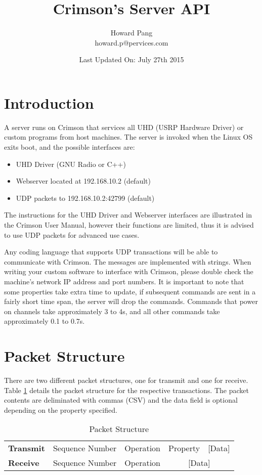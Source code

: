 \documentclass[11pt]{article}
\title{\textbf{Crimson's Server API}}
\author{Howard Pang\\
	howard.p@pervices.com}
\date{Last Updated On: July 27th 2015}
\begin{document}
\maketitle

\section{Introduction}
\label{sec:introduction}
A server runs on Crimson that services all UHD (USRP Hardware Driver) or custom programs from host machines. The server is invoked when the Linux OS exits boot, and the possible interfaces are:
\begin{itemize}
	\item UHD Driver (GNU Radio or C++)
	\item Webserver located at 192.168.10.2 (default)
	\item UDP packets to 192.168.10.2:42799 (default)
\end{itemize}
The instructions for the UHD Driver and Webserver interfaces are illustrated in the Crimson User Manual, however their functions are limited, thus it is advised to use UDP packets for advanced use cases.

Any coding language that supports UDP transactions will be able to communicate with Crimson. The messages are implemented with strings. When writing your custom software to interface with Crimson, please double check the machine's network IP address and port numbers. It is important to note that some properties take extra time to update, if subsequent commands are sent in a fairly short time span, the server will drop the commands. Commands that power on channels take approximately 3 to 4s, and all other commands take approximately 0.1 to 0.7s.

\section{Packet Structure}
\label{sec:packet-structure}
There are two different packet structures, one for transmit and one for receive. Table \ref{table:packet-structure} details the packet structure for the respective transactions. The packet contents are deliminated with commas (CSV) and the data field is optional depending on the property specified.

\begin{table}[H]
\centering
\caption{Packet Structure}
\label{table:packet-structure}
\begin{tabular}{l|l|l|l|l|}
\cline{2-5}
{\bf Transmit} & Sequence Number & Operation & Property      & {[}Data{]}      \\ \cline{2-5} 
{\bf Receive}  & Sequence Number & Operation & \multicolumn{2}{c|}{{[}Data{]}} \\ \cline{2-5} 
\end{tabular}
\end{table}
\end{document}

